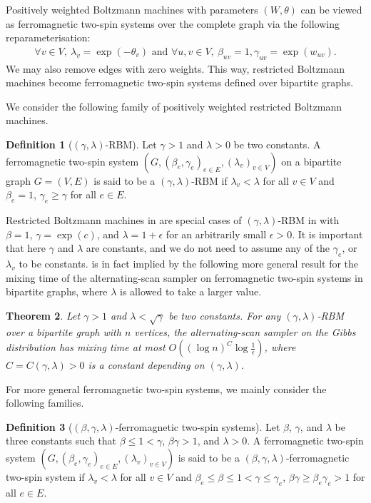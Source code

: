 \documentclass[11pt]{amsart}
\newtheorem{theorem}{Theorem}
\theoremstyle{definition}
\newtheorem{definition}[theorem]{Definition}
\theoremstyle{remark}
\begin{document}
Positively weighted Boltzmann machines with parameters $(W,\theta)$ can be viewed as ferromagnetic two-spin systems over the complete graph via the following reparameterisation:
\begin{align*}
  \forall v\in V,\ \lambda_v = \exp(-\theta_v)
  \text{ and }\forall u,v\in V,\ \beta_{uv} = 1, \gamma_{uv} = \exp(w_{uv}).
\end{align*}
We may also remove edges with zero weights.
This way, restricted Boltzmann machines become ferromagnetic two-spin systems defined over bipartite graphs.

We consider the following family of positively weighted restricted Boltzmann machines.
\begin{definition}[$(\gamma,\lambda)$-RBM]\label{def:gamma-lambda-rbm}
    Let $\gamma > 1$ and $\lambda > 0$ be two constants.
    A ferromagnetic two-spin system $(G,(\beta_e,\gamma_e)_{e \in E},(\lambda_v)_{v \in V})$ on a bipartite graph $G=(V,E)$ is said to be a $(\gamma,\lambda)$-RBM 
    if $\lambda_v < \lambda$ for all $v \in V$ and $\beta_e = 1$, $\gamma_e \geq \gamma$ for all $e \in E$.
  \end{definition}
Restricted Boltzmann machines in  are special cases of $(\gamma,\lambda)$-RBM in  with $\beta = 1$, $\gamma = \exp(c)$, and $\lambda = 1+\epsilon$ for an arbitrarily small $\epsilon>0$. 
It is important that here $\gamma$ and $\lambda$ are constants, and we do not need to assume any of the $\gamma_e$, or $\lambda_v$ to be constants.
 is in fact implied by the following more general result for the mixing time of the alternating-scan sampler on ferromagnetic two-spin systems in bipartite graphs, where $\lambda$ is allowed to take a larger value. 
\begin{theorem}\label{thm:alternating-scan-mixing-ferromagnetic-two-spin-system}
    Let $\gamma > 1$ and $\lambda < \sqrt{\gamma}$ be two constants.
    For any $(\gamma,\lambda)$-RBM over a bipartite graph with $n$ vertices, 
    the alternating-scan sampler on the Gibbs distribution has mixing time at most $O((\log n)^{C} \log \frac{1}{\epsilon})$, where $C = C(\gamma,\lambda) > 0$ is a constant depending on $(\gamma,\lambda)$.
\end{theorem}


For more general ferromagnetic two-spin systems,
we mainly consider the following families.
\begin{definition}[$(\beta,\gamma,\lambda)$-ferromagnetic two-spin systems]\label{def:ferromagnetic-two-spin-system}
  Let $\beta$, $\gamma$, and $\lambda$ be three constants such that $\beta \leq 1 < \gamma$, $\beta\gamma > 1$, and $\lambda > 0$.
  A ferromagnetic two-spin system $(G,(\beta_e,\gamma_e)_{e \in E},(\lambda_v)_{v \in V})$ is said to be a $(\beta,\gamma,\lambda)$-ferromagnetic two-spin system 
  if $\lambda_v < \lambda$ for all $v \in V$ and $\beta_e \leq \beta \leq 1 < \gamma \leq \gamma_e$, $\beta\gamma \geq \beta_e \gamma_e > 1$ for all $e \in E$.
\end{definition}
\end{document}
